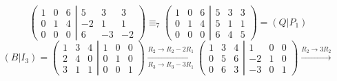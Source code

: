 \documentclass{article}
\begin{document}
\[
    \left(
    \begin{matrix}
            1 & 0 & 6 \\
            0 & 1 & 4 \\
            0 & 0 & 0
        \end{matrix}
    \left|
    \begin{matrix}
            5  & 3  & 3  \\
            -2 & 1  & 1  \\
            6  & -3 & -2
        \end{matrix}
    \right.
    \right)
    \equiv_7
    \left(
    \begin{matrix}
            1 & 0 & 6 \\
            0 & 1 & 4 \\
            0 & 0 & 0
        \end{matrix}
    \left|
    \begin{matrix}
            5 & 3 & 3 \\
            5 & 1 & 1 \\
            6 & 4 & 5
        \end{matrix}
    \right.
    \right)
    =(Q | P_1)
\]
\[
    (B | I_3) =
    \left(
    \begin{matrix}
            1 & 3 & 4 \\
            2 & 4 & 0 \\
            3 & 1 & 1
        \end{matrix}
    \left|
    \begin{matrix}
            1 & 0 & 0 \\
            0 & 1 & 0 \\
            0 & 0 & 1
        \end{matrix}
    \right.
    \right)
    \xrightarrow[R_3\rightarrow R_3-3R_1]{R_2\rightarrow R_2-2R_1}
    \left(
    \begin{matrix}
            1 & 3 & 4 \\
            0 & 5 & 6 \\
            0 & 6 & 3
        \end{matrix}
    \left|
    \begin{matrix}
            1  & 0 & 0 \\
            -2 & 1 & 0 \\
            -3 & 0 & 1
        \end{matrix}
    \right.
    \right)
    \xrightarrow{R_2\rightarrow 3R_2}
\]
\end{document}
